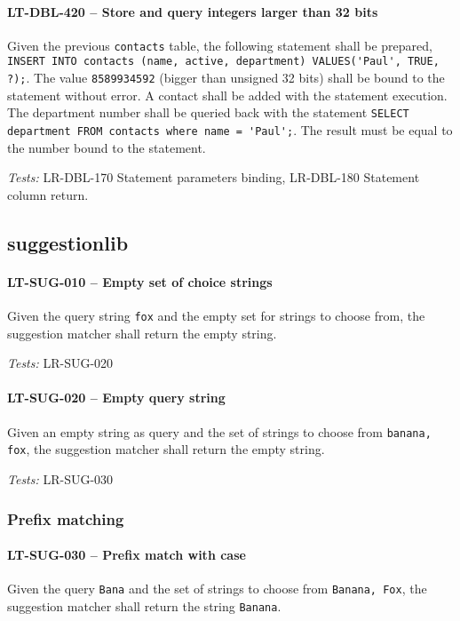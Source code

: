 \paragraph{LT-DBL-420 -- Store and query integers larger than 32 bits}
Given the previous \lstinline{contacts} table,
the following statement shall be prepared,
\lstinline{INSERT INTO contacts (name, active, department) VALUES('Paul', TRUE, ?);}.
The value \lstinline{8589934592} (bigger than unsigned 32 bits)
shall be bound to the statement without error.
A contact shall be added with the statement execution.
The department number shall be queried back with the statement
\lstinline{SELECT department FROM contacts where name = 'Paul';}.
The result must be equal to the number bound to the statement.

\textit{Tests: } LR-DBL-170 Statement parameters binding, LR-DBL-180 Statement
column return.

\subsection{suggestion\textunderscore lib}
\paragraph{LT-SUG-010 -- Empty set of choice strings}
Given the query string \lstinline{fox} and the empty set for strings
to choose from, the suggestion matcher shall return the empty string.

\textit{Tests: } LR-SUG-020

\paragraph{LT-SUG-020 -- Empty query string}
Given an empty string as query and the set of strings to choose
from \lstinline{banana, fox}, the suggestion matcher shall
return the empty string.

\textit{Tests: } LR-SUG-030

\subsubsection{Prefix matching}
\paragraph{LT-SUG-030 -- Prefix match with case}
Given the query \lstinline{Bana} and the set of strings to choose
from \lstinline{Banana, Fox}, the suggestion matcher shall
return the string \lstinline{Banana}.

